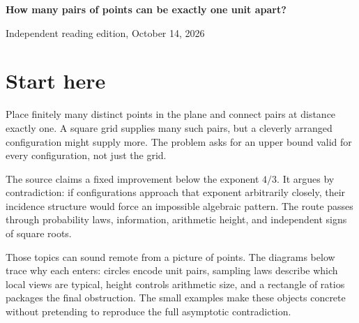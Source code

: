 \documentclass[11pt]{article}
\begin{document}
\begin{center}{\LARGE\bfseries How many pairs of points can be exactly one unit apart?}\par\vspace{12pt}{\large An illustrated reader for the planar unit-distance upper bound}\par\vspace{16pt}Independent reading edition, October 14, 2026\end{center}
\section*{Start here}Place finitely many distinct points in the plane and connect pairs at distance exactly one. A square grid supplies many such pairs, but a cleverly arranged configuration might supply more. The problem asks for an upper bound valid for every configuration, not just the grid.

The source claims a fixed improvement below the exponent $4/3$. It argues by contradiction: if configurations approach that exponent arbitrarily closely, their incidence structure would force an impossible algebraic pattern. The route passes through probability laws, information, arithmetic height, and independent signs of square roots.

Those topics can sound remote from a picture of points. The diagrams below trace why each enters: circles encode unit pairs, sampling laws describe which local views are typical, height controls arithmetic size, and a rectangle of ratios packages the final obstruction. The small examples make these objects concrete without pretending to reproduce the full asymptotic contradiction.
\end{document}
